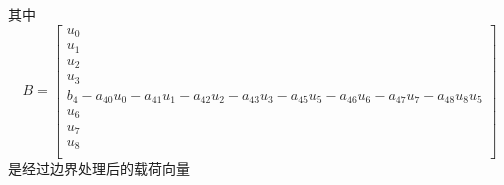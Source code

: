 \documentclass[12pt,a4paper]{article}
\begin{document}
其中
$$
B=\begin{bmatrix}
u_{0} \\
u_{1} \\
u_{2} \\
u_{3} \\
b_4-a_{40}u_0-a_{41}u_1-a_{42}u_2-a_{43}u_3-a_{45}u_5-a_{46}u_6-a_{47}u_7-a_{48}u_8
u_{5} \\
u_{6} \\
u_{7} \\
u_{8} \\
\end{bmatrix}
$$
是经过边界处理后的载荷向量



































%

%
\end{document}
